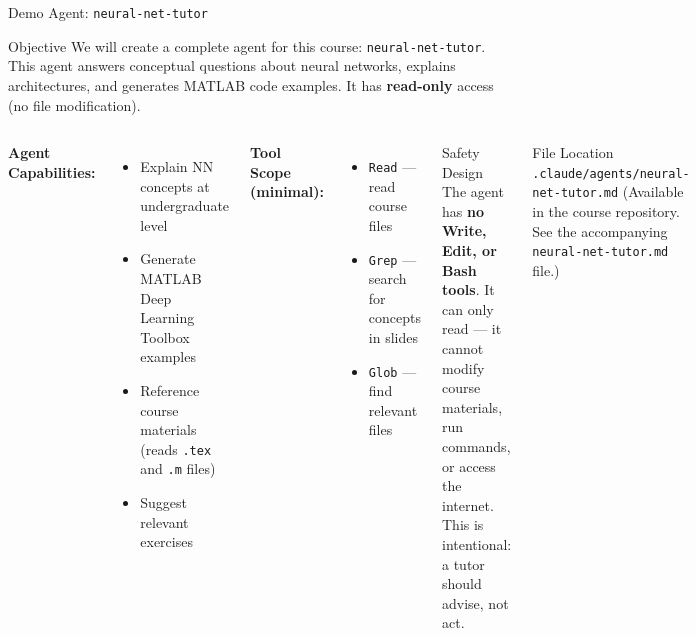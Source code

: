 \documentclass[aspectratio=169,xcolor=dvipsnames]{beamer}
\begin{document}
\begin{frame}{Demo Agent: \texttt{neural-net-tutor}}
    \begin{block}{Objective}
        We will create a complete agent for this course: \texttt{neural-net-tutor}. This agent answers conceptual questions about neural networks, explains architectures, and generates MATLAB code examples. It has \textbf{read-only} access (no file modification).
    \end{block}

    \begin{columns}
        \textbf{Agent Capabilities:}
        \begin{itemize}
            \item Explain NN concepts at undergraduate level
            \item Generate MATLAB Deep Learning Toolbox examples
            \item Reference course materials (reads \texttt{.tex} and \texttt{.m} files)
            \item Suggest relevant exercises
        \end{itemize}
        \textbf{Tool Scope (minimal):}
        \begin{itemize}
            \item \texttt{Read} --- read course files
            \item \texttt{Grep} --- search for concepts in slides
            \item \texttt{Glob} --- find relevant files
        \end{itemize}

        \begin{alertblock}{Safety Design}
            The agent has \textbf{no Write, Edit, or Bash tools}. It can only read --- it cannot modify course materials, run commands, or access the internet. This is intentional: a tutor should advise, not act.
        \end{alertblock}
        \begin{block}{File Location}
            \texttt{.claude/agents/neural-net-tutor.md}
            \vspace{0.2cm}
            (Available in the course repository. See the accompanying \texttt{neural-net-tutor.md} file.)
        \end{block}
    \end{columns}
\end{frame}
\end{document}
